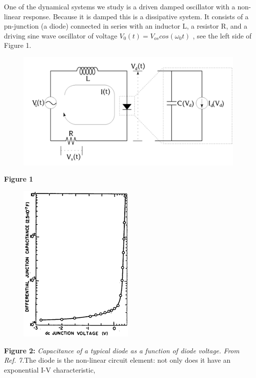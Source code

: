 \documentclass{../lab}
\begin{document}
One of the dynamical systems we study is a driven damped oscillator with a non-linear response. Because it is damped this is a dissipative system. It consists of a pn-junction (a diode) connected in series with an inductor L, a resistor R, and a driving sine wave oscillator of voltage $ V_0(t)=V_{os}cos\left ({\omega }_0t \right ) $ , see the left side of Figure 1.


\begin{figure}[h]
    \centering
    \href{http://experimentationlab.berkeley.edu/sites/default/files/images/Nldimage004.gif}{\includegraphics[width=0.5\linewidth]{images/Nldimage004.png}}
    \caption{}
    \label{fig:Nldimage004}
\end{figure}

\textbf{Figure 1}\begin{figure}[h]
    \centering
    \href{http://experimentationlab.berkeley.edu/sites/default/files/images/Nldimage005.gif}{\includegraphics[width=0.5\linewidth]{images/Nldimage005.png}}
    \caption{}
    \label{fig:Nldimage005}
\end{figure}




\textbf{Figure 2:} \emph{Capacitance of a typical diode as a function of diode voltage. From Ref. 7.}The diode is the non-linear circuit element: not only does it have an exponential I-V characteristic,
\end{document}
